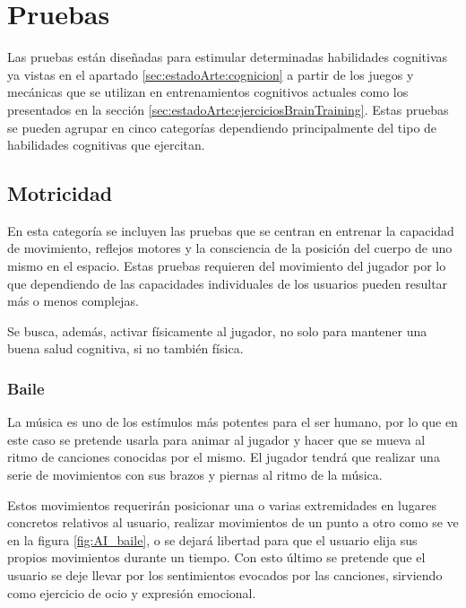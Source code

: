 \section{Pruebas}
\label{sec:estudio:pruebas}
Las pruebas están diseñadas para estimular determinadas habilidades cognitivas ya vistas en el apartado \ref{sec:estadoArte:cognicion} a partir de los juegos y mecánicas que se utilizan en entrenamientos cognitivos actuales como los presentados en la sección \ref{sec:estadoArte:ejerciciosBrainTraining}.
Estas pruebas se pueden agrupar en cinco categorías dependiendo principalmente del tipo de habilidades cognitivas que ejercitan.



\subsection{Motricidad}

En esta categoría se incluyen las pruebas que se centran en entrenar la capacidad de movimiento, reflejos motores y la consciencia de la posición del cuerpo de uno mismo en el espacio. Estas pruebas requieren del movimiento del jugador por lo que dependiendo de las capacidades individuales de los usuarios pueden resultar más o menos complejas. 

Se busca, además, activar físicamente al jugador, no solo para mantener una buena salud cognitiva, si no también física.

\subsubsection{Baile}

La música es uno de los estímulos más potentes para el ser humano, por lo que en este caso se pretende usarla para animar al jugador y hacer que se mueva al ritmo de canciones conocidas por el mismo. El jugador tendrá que realizar una serie de movimientos con sus brazos y piernas al ritmo de la música. 

Estos movimientos requerirán posicionar una o varias extremidades en lugares concretos relativos al usuario, realizar movimientos de un punto a otro como se ve en la figura \ref{fig:AI_baile}, o se dejará libertad para que el usuario elija sus propios movimientos durante un tiempo. Con esto último se pretende que el usuario se deje llevar por los sentimientos evocados por las canciones, sirviendo como ejercicio de ocio y expresión emocional.

